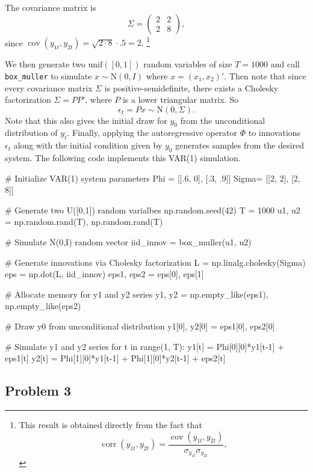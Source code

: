 \documentclass[oneside, a4paper]{amsart}
\DeclareMathOperator{\cov}{cov}
\DeclareMathOperator{\corr}{corr}
\newcommand{\eps}{\epsilon}
\newcommand{\N}{\mathrm N}
\newcommand{\U}{\mathrm{unif}}
\begin{document}
The covariance matrix is 
\[
	\Sigma = \begin{pmatrix}
			2 & 2 \\
			2 & 8
	\end{pmatrix},
\]
since $\cov(y_{1t}, y_{2t}) = \sqrt{2 \cdot 8} \cdot .5 = 2$.
\footnote{This result is obtained directly from the fact that
\[
	\corr(y_{1t}, y_{2t}) = \frac{\cov(y_{1t}, y_{2t})}{\sigma_{y_{1t}} \sigma_{y_{2t}}},
\]}


We then generate two $\U([0,1])$ random variables of size $T=1000$ and call \texttt{box_muller} to simulate $x \sim \N(0,I)$ where $x = (x_1, x_2)'$. Then note that since every covariance matrix $\Sigma$ is positive-semidefinite, there exists a Cholesky factorization $\Sigma = PP'$, where $P$ is a lower triangular matrix. So 
\[
	\eps_t = P x \sim \N(0, \Sigma).
\]
Note that this also gives the initial draw for $y_0$ from the unconditional distribution of $y_t$. Finally, applying the autoregressive operator $\Phi$ to innovations $\eps_t$ along with the initial condition given by $y_0$ generates samples from the desired system. The following code implements this VAR(1) simulation.

\begin{python3code}
# Initialize VAR(1) system parameters
Phi = [[.6, 0], [.3, .9]]
Sigma= [[2, 2], [2, 8]]

# Generate two U([0,1]) random varialbes 
np.random.seed(42)
T = 1000
u1, u2 = np.random.rand(T), np.random.rand(T)

# Simulate N(0,I) random vector 
iid_innov = box_muller(u1, u2)

# Generate innovations via Cholesky factorization  
L = np.linalg.cholesky(Sigma)
eps = np.dot(L, iid_innov)
eps1, eps2 = eps[0], eps[1]

# Allocate memory for y1 and y2 series 
y1, y2 = np.empty_like(eps1), np.empty_like(eps2)

# Draw y0 from unconditional distribution 
y1[0], y2[0] = eps1[0], eps2[0]

# Simulate y1 and y2 series  
for t in range(1, T):
    y1[t] = Phi[0][0]*y1[t-1] + eps1[t]
    y2[t] = Phi[1][0]*y1[t-1] + Phi[1][0]*y2[t-1] + eps2[t]
\end{python3code}


\subsection*{Problem 3}
\end{document}
